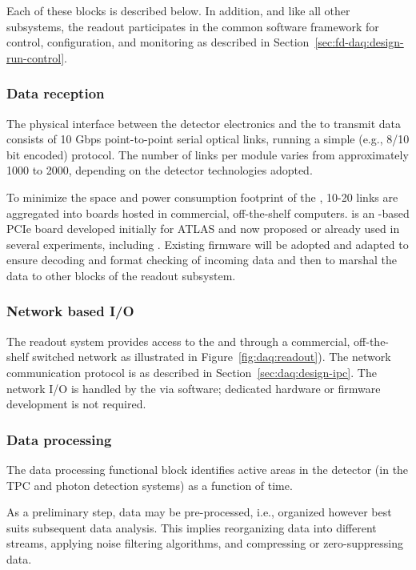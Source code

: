 Each of these blocks is described below.  In addition, and like all other  subsystems, the readout participates in the common software framework for control, configuration, and monitoring as described in Section~\ref{sec:fd-daq:design-run-control}.

\subsubsection{Data reception}

The physical interface between the detector electronics and the  to transmit data consists of 10 Gbps point-to-point serial optical links, running a simple (e.g., 8/10 bit encoded) protocol. 
The number of links per  module varies from approximately 1000 to 2000, depending on the detector technologies adopted.

To minimize the space and power consumption footprint of the , 10-20 links are aggregated into  boards hosted in commercial, off-the-shelf computers.
 is an -based PCIe board developed initially for ATLAS and now proposed or already used in several experiments, including . 
Existing firmware will be adopted and adapted to ensure decoding and format checking of incoming data and then to marshal the data to other blocks of the readout subsystem.

\subsubsection{Network based I/O}

The readout system provides access to the  and  through a commercial, off-the-shelf switched network as illustrated in Figure~\ref{fig:daq:readout}).
The network communication protocol is as described in Section~\ref{sec:daq:design-ipc}.
The network I/O is handled by the  via software; dedicated hardware or firmware development is not required.

\subsubsection{Data processing}

The data processing functional block identifies active areas in the detector (in the TPC and photon detection systems) as a function of time.

As a preliminary step, data may be pre-processed, i.e., organized however best suits subsequent data analysis. This implies reorganizing data into different streams, applying noise filtering algorithms, and compressing or zero-suppressing data.

